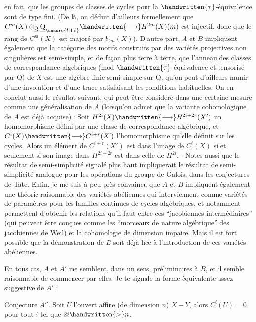en fait, que les groupes de classes de cycles pour la $\handwritten{\tau}$-équivalence sont de type fini. (De là, on déduit d'ailleurs formellement que $C^m(X)\otimes_{\underline{\mathrm{Q}}}\underline{\mathrm{Q}}_{\unsure{l|1|\ell}}\handwritten{\longrightarrow} H^{2m}(X)(m)$ est injectif, donc que le rang de $C^m(X)$ est majoré par $b_{2m}(X)$). D'autre part, $A$ et $B$ impliquent également que la catégorie des motifs construits par des variétés projectives non singulières est semi-simple, et de façon plus terre à terre, que l'anneau des classes de correspondance algébriques (mod $\handwritten{\tau}$-équivalence et tensorisé par $\underline{\mathrm{Q}}$) de $X$ est une algèbre finie semi-simple sur $\underline{\mathrm{Q}}$, qu'on peut d'ailleurs munir d'une involution et d'une trace satisfaisant les conditions habituelles. On en conclut aussi le résultat suivant, qui peut être considéré dans une certaine mesure comme une généralisation de $A$ (lorsqu'on admet que la variante cohomologique de $A$ est déjà acquise) : Soit $H^{2i}(X)\handwritten{\longrightarrow} H^{2i+2r}(X')$ un homomorphisme défini par une classe de correspondance algébrique, et $C^i(X)\handwritten{\longrightarrow} C^{i+r}(X')$ l'homomorphisme qu'elle définit sur les cycles. Alors un élément de $C^{i+r}(X')$ est dans l'image de $C^i(X)$ si et seulement si son image dans $H^{2i+2r}$ est dans celle de $H^{2i}$. - Notes aussi que le résultat de semi-simplicité signalé plus haut impliquerait le résultat de semi-simplicité analogue pour les opérations du groupe de Galois, dans les conjectures de Tate. Enfin, je me suis à peu près convaincu que $A$ et $B$ impliquent également une théorie raisonnable des variétés abéliennes qui interviennent comme variétés de paramètres pour les familles continues de cycles algébriques, et notamment permettent d'obtenir les relations qu'il faut entre ces ``jacobiennes intermédiaires'' (qui peuvent être conçues comme les ``morceaux de nature algébrique'' des jacobiennes de Weil) et la cohomologie de dimension impaire. Mais il est fort possible que la démonstration de $B$ soit déjà liée à l'introduction de ces variétés abéliennes.

En tous cas, $A$ et $A'$ me semblent, dans un sens, préliminaires à $B$, et il semble raisonnable de commencer par elles. Je te signale la forme équivalente assez suggestive de $A'$ :

\uline{Conjecture} $A''$. Soit $U$ l'ouvert affine (de dimension $n$) $X-Y$, alors $C^i(U)=0$ pour tout $i$ tel que $2i\handwritten{>}n$.
